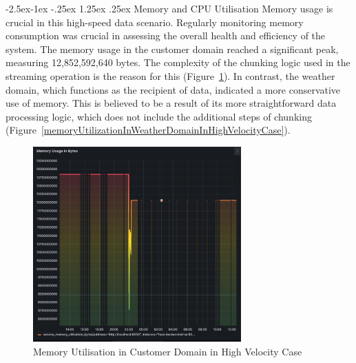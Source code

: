\documentclass[review]{elsarticle}
\makeatletter
\renewcommand\paragraph{\@startsection{paragraph}{4}{\z@}%
            {-2.5ex\@plus -1ex \@minus -.25ex}%
            {1.25ex \@plus .25ex}%
            {\normalfont\normalsize\itshape}}
\makeatother
\begin{document}
\paragraph{Memory and CPU Utilisation} Memory usage is crucial in this high-speed data scenario. Regularly monitoring memory consumption was crucial in assessing the overall health and efficiency of the system. The memory usage in the customer domain reached a significant peak, measuring 12,852,592,640 bytes. The complexity of the chunking logic used in the streaming operation is the reason for this (Figure~\ref{memoryUtilizationInCustomerDomainInHighVelocityCase}). In contrast, the weather domain, which functions as the recipient of data, indicated a more conservative use of memory. This is believed to be a result of its more straightforward data processing logic, which does not include the additional steps of chunking (Figure~\ref{memoryUtilizationInWeatherDomainInHighVelocityCase}).

\begin{figure}[h]

  \centering

  \includegraphics[width=8cm]{images/memory-utilization-in-customer-domain-in-streaming-case.png}

  \caption{Memory Utilisation in Customer Domain in High Velocity Case}

  \label{memoryUtilizationInCustomerDomainInHighVelocityCase}

\end{figure}
\end{document}
